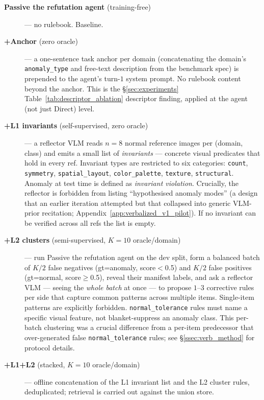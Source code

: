 \begin{description}
\item[\textbf{Passive the refutation agent} (training-free)] — no rulebook. Baseline.
\item[\textbf{+Anchor} (zero oracle)] — a one-sentence task anchor
  per domain (concatenating the domain's \texttt{anomaly\_type} and
  free-text description from the benchmark spec) is prepended to the
  agent's turn-$1$ system prompt. No rulebook content beyond the
  anchor. This is the \S\ref{sec:experiments} Table~\ref{tab:descriptor_ablation}
  descriptor finding, applied at the agent (not just Direct) level.
\item[\textbf{+L1 invariants} (self-supervised, zero oracle)] — a
  reflector VLM reads $n{=}8$ normal reference images per
  (domain, class) and emits a small list of \emph{invariants} ---
  concrete visual predicates that hold in every ref. Invariant types
  are restricted to six categories: \texttt{count}, \texttt{symmetry},
  \texttt{spatial\_layout}, \texttt{color\_palette}, \texttt{texture},
  \texttt{structural}. Anomaly at test time is defined as
  \emph{invariant violation}. Crucially, the reflector is forbidden
  from listing ``hypothesised anomaly modes'' (a design that an
  earlier iteration attempted but that collapsed into generic
  VLM-prior recitation; Appendix~\ref{app:verbalized_v1_pilot}).
  If no invariant can be verified across all refs the list is empty.
\item[\textbf{+L2 clusters} (semi-supervised, $K{=}10$ oracle/domain)]
  — run Passive the refutation agent on the dev split, form a balanced batch of
  $K/2$ false negatives (gt=anomaly, score{$<$}0.5) and $K/2$ false
  positives (gt=normal, score{$\ge$}0.5), reveal their manifest
  labels, and ask a reflector VLM --- seeing the \emph{whole batch}
  at once --- to propose $1$--$3$ corrective rules per side that
  capture common patterns across multiple items. Single-item patterns
  are explicitly forbidden. \texttt{normal\_tolerance} rules must
  name a specific visual feature, not blanket-suppress an anomaly
  class. This per-batch clustering was a crucial difference from a
  per-item predecessor that over-generated false \texttt{normal\_tolerance}
  rules; see \S\ref{ssec:verb_method} for protocol details.
\item[\textbf{+L1+L2} (stacked, $K{=}10$ oracle/domain)] — offline
  concatenation of the L1 invariant list and the L2 cluster rules,
  deduplicated; retrieval is carried out against the union store.
\end{description}


